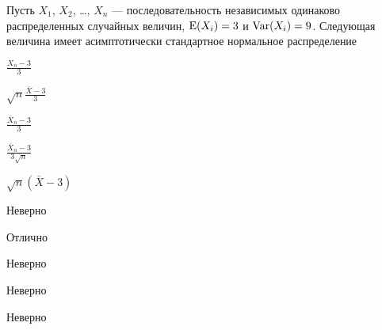 
\begin{question}
Пусть \(X_1\), \(X_2\), \ldots, \(X_n\) --- последовательность
независимых одинаково распределенных случайных величин, \(\operatorname{E}(X_i)=3\) и
\(\operatorname{Var}(X_i)=9\). Следующая величина имеет асимптотически стандартное
нормальное распределение
\begin{answerlist}
  \item \(\frac{X_n-3}{3}\)
  \item \(\sqrt{n}\frac{\bar{X}-3}{3}\)
  \item \(\frac{\bar{X}_n-3}{3}\)
  \item \(\frac{\bar{X}_n-3}{3\sqrt{n}}\)
  \item \(\sqrt{n}(\bar{X}-3)\)
\end{answerlist}
\end{question}

\begin{solution}
\begin{answerlist}
  \item Неверно
  \item Отлично
  \item Неверно
  \item Неверно
  \item Неверно
\end{answerlist}
\end{solution}

